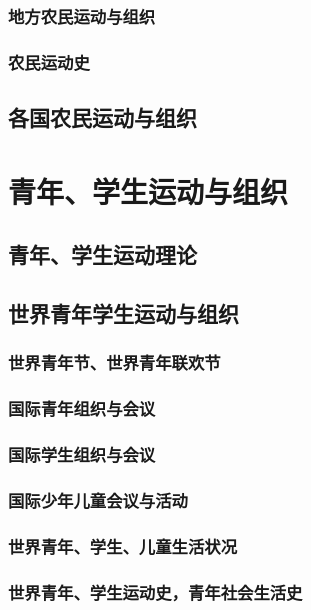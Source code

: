 \documentclass[UTF8]{../RepresentationUniverse}
\begin{document}
    \subsubsection{地方农民运动与组织}
    \subsubsection{农民运动史}

\subsection{各国农民运动与组织}





\section{青年、学生运动与组织}
\subsection{青年、学生运动理论}
\subsection{世界青年学生运动与组织}
    \subsubsection{世界青年节、世界青年联欢节}
    \subsubsection{国际青年组织与会议}
    \subsubsection{国际学生组织与会议}
    \subsubsection{国际少年儿童会议与活动}
    \subsubsection{世界青年、学生、儿童生活状况}
    \subsubsection{世界青年、学生运动史，青年社会生活史}
\end{document}
